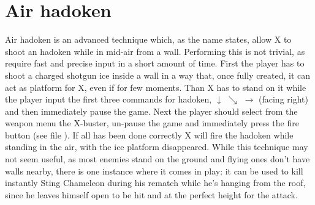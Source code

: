 \section{Air hadoken}
Air hadoken is an advanced technique which, as the name states, allow X to shoot an hadoken while in mid-air from a wall. Performing this is not trivial, as require fast and precise input in a short amount of time. First the player has to shoot a charged shotgun ice inside a wall in a way that, once fully created, it can act as platform for X, even if for few moments. Than X has to stand on it while the player input the first three commands for hadoken, $\downarrow$ $\searrow$ $\rightarrow$ (facing right) and then immediately pause the game. Next the player should select from the weapon menu the X-buster, un-pause the game and immediately press the fire button (see file ). If all has been done correctly X will fire the hadoken while standing in the air, with the ice platform disappeared. While this technique may not seem useful, as most enemies stand on the ground and flying ones don't have walls nearby, there is one instance where it comes in play: it can be used to kill instantly Sting Chameleon during his rematch while he's hanging from the roof, since he leaves himself open to be hit and at the perfect height for the attack.

